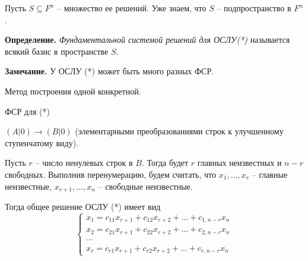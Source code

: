 Пусть $S \subseteq F^n$ -- множество ее решений. Уже знаем, что $S$ -- подпространство в $F^n$.

\vspace{\baselineskip}
\textbf{Определение.} \textit{Фундаментальной системой решений для ОСЛУ(*)} называется всякий базис в пространстве $S$.

\vspace{\baselineskip}
\textbf{Замечание.} У ОСЛУ (*) может быть много разных ФСР.

Метод построения одной конкретной.

ФСР для (*)

$(A|0) \rightarrow (B|0)$ (элементарными преобразованиями строк к улучшенному ступенчатому виду).

Пусть $r$ -- число ненулевых строк в $B$. Тогда будет $r$ главных неизвестных и $n-r$ свободных. Выполнив перенумерацию, будем считать, что $x_1, \dots, x_r$ -- главные неизвестные, $x_{r+1}, \dots, x_n$ -- свободные неизвестные.

Тогда общее решение ОСЛУ (*) имеет вид
\[
\begin{cases}
x_1 = c_{11} x_{r+1} + c_{12} x_{r+2} + \dots + c_{1, n-r} x_n \\
x_2 = c_{21} x_{r+1} + c_{22} x_{r+2} + \dots + c_{2, n-r} x_n \\
\cdots \\
x_r = c_{r1} x_{r+1} + c_{r2} x_{r+2} + \dots + c_{r, n-r} x_n
\end{cases}
\]

